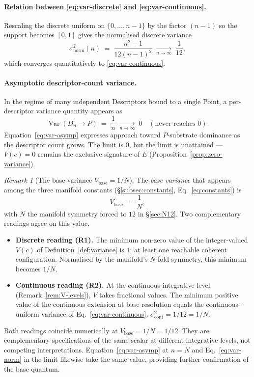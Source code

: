 \documentclass[11pt,a4paper]{article}
\theoremstyle{definition}
\theoremstyle{remark}
\newtheorem{remark}[theorem]{Remark}
\begin{document}
\paragraph{Relation between \eqref{eq:var-discrete} and \eqref{eq:var-continuous}.}
Rescaling the discrete uniform on $\{0,\ldots,n-1\}$ by the factor $(n-1)$ so the support becomes $[0,1]$ gives the normalised discrete variance
\begin{equation}\label{eq:var-norm}
\sigma^{2}_{\text{norm}}(n) \;=\; \frac{n^{2}-1}{12(n-1)^{2}} \;\xrightarrow[n\to\infty]{}\; \frac{1}{12},
\end{equation}
which converges quantitatively to \eqref{eq:var-continuous}.

\paragraph{Asymptotic descriptor-count variance.}
In the regime of many independent Descriptors bound to a single Point, a per-descriptor variance quantity appears as
\begin{equation}\label{eq:var-asymp}
\operatorname{Var}(D_{n}\to P) \;=\; \frac{1}{n} \;\xrightarrow[n\to\infty]{}\; 0 \quad (\text{never reaches } 0).
\end{equation}
Equation~\eqref{eq:var-asymp} expresses approach toward $P$-substrate dominance as the descriptor count grows. The limit is $0$, but the limit is unattained --- $V(c)=0$ remains the exclusive signature of $E$ (Proposition~\ref{prop:zero-variance}).

\begin{remark}[The base variance $V_{\text{base}} = 1/N$]\label{rem:V-base}
The \emph{base variance} that appears among the three manifold constants (\S\ref{subsec:constants}, Eq.~\eqref{eq:constants}) is
\[
V_{\text{base}} \;=\; \frac{1}{N},
\]
with $N$ the manifold symmetry forced to $12$ in \S\ref{sec:N12}. Two complementary readings agree on this value.

\begin{itemize}[leftmargin=*]
\item \textbf{Discrete reading (R1).} The minimum non-zero value of the integer-valued $V(c)$ of Definition~\ref{def:variance} is $1$: at least one reachable coherent configuration. Normalised by the manifold's $N$-fold symmetry, this minimum becomes $1/N$.

\item \textbf{Continuous reading (R2).} At the continuous integrative level (Remark~\ref{rem:V-levels}), $V$ takes fractional values. The minimum positive value of the continuous extension at base resolution equals the continuous-uniform variance of Eq.~\eqref{eq:var-continuous}, $\sigma^{2}_{\text{cont}} = 1/12 = 1/N$.
\end{itemize}

Both readings coincide numerically at $V_{\text{base}} = 1/N = 1/12$. They are complementary specifications of the same scalar at different integrative levels, not competing interpretations. Equation~\eqref{eq:var-asymp} at $n=N$ and Eq.~\eqref{eq:var-norm} in the limit likewise take the same value, providing further confirmation of the base quantum.
\end{remark}
\end{document}
